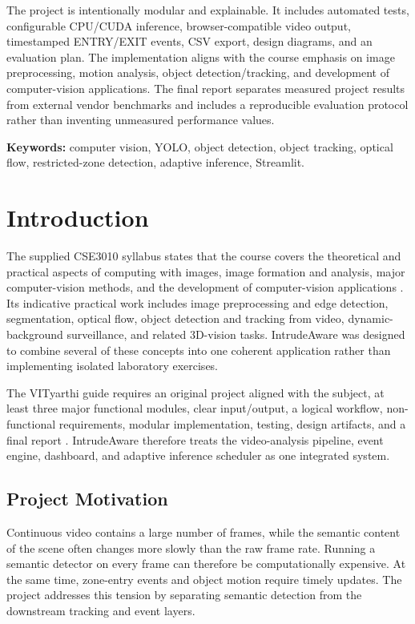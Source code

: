 \documentclass[12pt,a4paper]{report}
\begin{document}
The project is intentionally modular and explainable. It includes automated tests, configurable CPU/CUDA inference, browser-compatible video output, timestamped ENTRY/EXIT events, CSV export, design diagrams, and an evaluation plan. The implementation aligns with the course emphasis on image preprocessing, motion analysis, object detection/tracking, and development of computer-vision applications. The final report separates measured project results from external vendor benchmarks and includes a reproducible evaluation protocol rather than inventing unmeasured performance values.

\textbf{Keywords:} computer vision, YOLO, object detection, object tracking, optical flow, restricted-zone detection, adaptive inference, Streamlit.

\tableofcontents
\listoffigures
\listoftables
\clearpage
{}

\chapter{Introduction}
The supplied CSE3010 syllabus states that the course covers the theoretical and practical aspects of computing with images, image formation and analysis, major computer-vision methods, and the development of computer-vision applications \cite{cse3010_syllabus}. Its indicative practical work includes image preprocessing and edge detection, segmentation, optical flow, object detection and tracking from video, dynamic-background surveillance, and related 3D-vision tasks. IntrudeAware was designed to combine several of these concepts into one coherent application rather than implementing isolated laboratory exercises.

The VITyarthi guide requires an original project aligned with the subject, at least three major functional modules, clear input/output, a logical workflow, non-functional requirements, modular implementation, testing, design artifacts, and a final report \cite{vityarthi_guide}. IntrudeAware therefore treats the video-analysis pipeline, event engine, dashboard, and adaptive inference scheduler as one integrated system.

\section{Project Motivation}
Continuous video contains a large number of frames, while the semantic content of the scene often changes more slowly than the raw frame rate. Running a semantic detector on every frame can therefore be computationally expensive. At the same time, zone-entry events and object motion require timely updates. The project addresses this tension by separating semantic detection from the downstream tracking and event layers.
\end{document}
